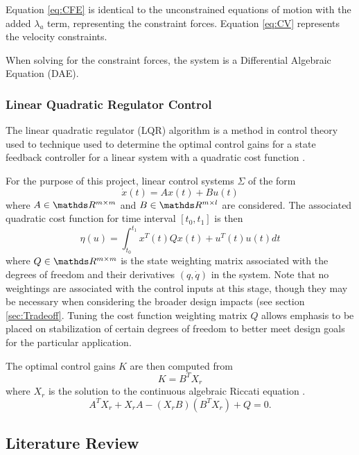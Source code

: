 Equation \ref{eq:CFE} is identical to the unconstrained equations of motion with the added $\lambda_{a}$ term, representing the constraint forces.
Equation \ref{eq:CV} represents the velocity constraints. 
\par
When solving for the constraint forces, the system is a Differential Algebraic Equation (DAE).

\subsubsection{Linear Quadratic Regulator Control}
The linear quadratic regulator (LQR) algorithm is a method in control theory used to technique used to determine the optimal control gains for a state feedback controller for a linear system with a quadratic cost function \cite{LabManual}.

For the purpose of this project, linear control systems $\Sigma$ of the form
\begin{equation}
\dot{x}(t) = Ax(t) + Bu(t)
\end{equation}
where $A \in \R^{m \times m}$ and $B \in \R^{m \times l}$ are considered.
The associated quadratic cost function for time interval $[t_{0},t_{1}]$ is then 
\begin{equation}
\eta(u) = \int_{t_{0}}^{t_{1}}x^{T}(t)Qx(t)+u^{T}(t)u(t)dt
\end{equation}
where $Q \in \R^{m \times m}$ is the state weighting matrix associated with the degrees of freedom and their derivatives $(q, \dot{q})$ in the system. Note that no weightings are associated with the control inputs at this stage, though they may be necessary when considering the broader design impacts (see section \ref{sec:Tradeoff}. Tuning the cost function weighting matrix $Q$ allows emphasis to be placed on stabilization of certain degrees of freedom to better meet design goals for the particular application.

The optimal control gains $K$ are then computed from
\begin{equation}
K = B^{T}X_{r}
\end{equation}
where  $X_{r}$ is the solution to the continuous algebraic Riccati equation \cite{RicattiSolve}.
\begin{equation}
A^{T}X_{r} + X_{r}A - (X_{r}B)(B^{T}X_{r}) + Q = 0.
\end{equation}

\subsection{Literature Review}
